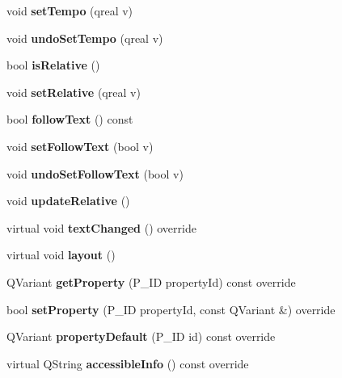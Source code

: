 \begin{DoxyCompactItemize}
void {\bfseries set\+Tempo} (qreal v)
\item 
\mbox{\label{class_ms_1_1_tempo_text_a56bcb902df08e74bec071a627bb6f724}} 
void {\bfseries undo\+Set\+Tempo} (qreal v)
\item 
\mbox{\label{class_ms_1_1_tempo_text_a5e59d5b0ee46556eb9e58762ea8d747d}} 
bool {\bfseries is\+Relative} ()
\item 
\mbox{\label{class_ms_1_1_tempo_text_a2e65c141351333195d2f1d5362c8b343}} 
void {\bfseries set\+Relative} (qreal v)
\item 
\mbox{\label{class_ms_1_1_tempo_text_a34ec9d874873c0f7c354960c0a107a1c}} 
bool {\bfseries follow\+Text} () const
\item 
\mbox{\label{class_ms_1_1_tempo_text_a9f917135685a067da6ca7399e47cbfb5}} 
void {\bfseries set\+Follow\+Text} (bool v)
\item 
\mbox{\label{class_ms_1_1_tempo_text_abfbc331d058d577fa2c8d9e2049a8fe6}} 
void {\bfseries undo\+Set\+Follow\+Text} (bool v)
\item 
\mbox{\label{class_ms_1_1_tempo_text_a1293bbea89221609e62b15455016a05d}} 
void {\bfseries update\+Relative} ()
\item 
\mbox{\label{class_ms_1_1_tempo_text_adef672516b3d47fe7ad90231f053cc0b}} 
virtual void {\bfseries text\+Changed} () override
\item 
\mbox{\label{class_ms_1_1_tempo_text_a4ba517d216481ba94eacfcf3e9a390e7}} 
virtual void {\bfseries layout} ()
\item 
\mbox{\label{class_ms_1_1_tempo_text_ae69850c9829aea1e31dc7859164c4444}} 
Q\+Variant {\bfseries get\+Property} (P\+\_\+\+ID property\+Id) const override
\item 
\mbox{\label{class_ms_1_1_tempo_text_acbe6546138ec2c8cbc526969f1afae6a}} 
bool {\bfseries set\+Property} (P\+\_\+\+ID property\+Id, const Q\+Variant \&) override
\item 
\mbox{\label{class_ms_1_1_tempo_text_a51a291904ce49b8a0760844bffae7437}} 
Q\+Variant {\bfseries property\+Default} (P\+\_\+\+ID id) const override
\item 
\mbox{\label{class_ms_1_1_tempo_text_a7576878ba4f0913316da0f46f105bfb0}} 
virtual Q\+String {\bfseries accessible\+Info} () const override
\end{DoxyCompactItemize}
